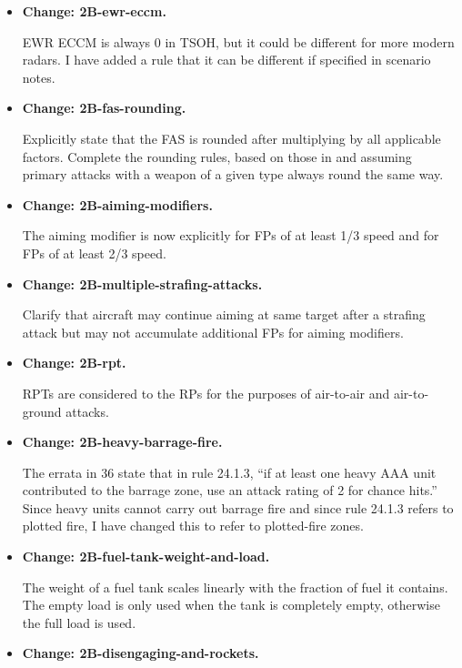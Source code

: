 \documentclass{report}
\newcommand{\changetag}[1]{\textbf{Change: #1.}\par}
\begin{document}
\begin{itemize}
        I have added a rule on infrared jammers. These appear as external stores in {\TSOH}.

    \item\changetag{2B-ewr-eccm}

        EWR ECCM is always 0 in TSOH, but it could be different for more modern radars. I have added a rule that it can be different if specified in scenario notes.

    \item\changetag{2B-fas-rounding}

        Explicitly state that the FAS is rounded after multiplying by all applicable factors. Complete the rounding rules, based on those in {\AirStr} and assuming primary attacks with a weapon of a given type always round the same way.

    \item\changetag{2B-aiming-modifiers}

        The aiming modifier is now explicitly  for FPs of at least 1/3 speed and  for FPs of at least 2/3 speed.

    \item\changetag{2B-multiple-strafing-attacks}

        Clarify that aircraft may continue aiming at same target after a strafing attack but may not accumulate additional FPs for aiming modifiers.

    \item\changetag{2B-rpt}

        RPTs are considered to the RPs for the purposes of air-to-air and air-to-ground attacks.

    \item\changetag{2B-heavy-barrage-fire}

        The errata in {\APJ} 36 state that in rule 24.1.3, “if at least one heavy AAA unit contributed to the barrage zone, use an attack rating of 2 for chance hits.” Since heavy units cannot carry out barrage fire and since rule 24.1.3 refers to plotted fire, I have changed this to refer to plotted-fire zones.

    \item\changetag{2B-fuel-tank-weight-and-load}

        The weight of a fuel tank scales linearly with the fraction of fuel it contains. The empty load is only used when the tank is completely empty, otherwise the full load is used.

    \item\changetag{2B-disengaging-and-rockets}


\end{itemize}
\end{document}
